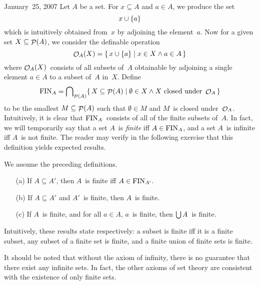 \begin{lecture}{January~25, 2007}
Let \(A\) be a set. For \(x\subseteq A\) and \(a\in A\), we produce the set
\[x\cup\{a\}\]
which is intuitively obtained from~\(x\) by adjoining the element~\(a\). Now for a given set \(X\subseteq\mathop{\mathcal{P}}(A)\), we consider the definable operation
\[\mathop{\mathcal{O}}\nolimits_A(X)=\{\,x\cup\{a\}\mid x\in X\land a\in A\,\}\]
where \(\mathop{\mathcal{O}}\nolimits_A(X)\)~consists of all subsets of~\(A\) obtainable by adjoining a single element \(a\in A\) to a subset of~\(A\) in~\(X\). Define
\[\operatorname{FIN}_A=\bigcap\nolimits_{\mathop{\mathcal{P}}(A)}\{\,X\subseteq\mathop{\mathcal{P}}(A)\mid\emptyset\in X\land X\text{ closed under }\mathop{\mathcal{O}}\nolimits_A\,\}\]
to be the smallest \(M\subseteq\mathop{\mathcal{P}}(A)\) such that \(\emptyset\in M\) and \(M\)~is closed under~\(\mathop{\mathcal{O}}\nolimits_A\). Intuitively, it is clear that \(\operatorname{FIN}_A\)~consists of all of the finite subsets of~\(A\). In fact, we will temporarily say that a set \(A\)~is \emph{finite} iff \(A\in\operatorname{FIN}_A\), and a set \(A\)~is infinite iff \(A\)~is not finite. The reader may verify in the following exercise that this definition yields expected results.
\begin{exercise}
We assume the preceding definitions.
\begin{enumerate}[itemsep=0pt]
\item[(a)] If \(A\subseteq A'\), then \(A\)~is finite iff \(A\in\operatorname{FIN}_{A'}\).
\item[(b)] If \(A\subseteq A'\) and \(A'\)~is finite, then \(A\)~is finite.
\item[(c)] If \(A\)~is finite, and for all \(a\in A\), \(a\)~is finite, then \(\bigcup A\)~is finite.
\end{enumerate}
Intuitively, these results state respectively: a subset is finite iff it is a finite subset, any subset of a finite set is finite, and a finite union of finite sets is finite.
\end{exercise}

It should be noted that without the axiom of infinity, there is no guarantee that there exist any infinite sets. In fact, the other axioms of set theory are consistent with the existence of only finite sets.
\end{lecture}
